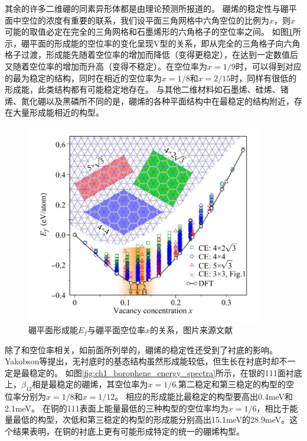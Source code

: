 其余的许多二维硼的同素异形体都是由理论预测所报道的\cite{liu2018intermixing, liu2013probing, penev2012polymorphism, zhang2017elasticity, zhao2016superconductivity, yang2008ab, zhang2016polyphony, tsafack2016thermomechanical, zhang2016substrate, ma2016graphene}。
硼烯的稳定性与硼平面中空位的浓度有重要的联系，我们设平面三角网格中六角空位的比例为$x$，则$x$可能的取值必定在完全的三角网格和石墨烯形的六角格子的空位率之间。
如图\ref{fig:ch1_formation_boronphenes}所示，硼平面的形成能的空位率的变化呈现V型的关系，即从完全的三角格子向六角格子过渡，形成能先随着空位率的增加而降低（变得更稳定），在达到一定数值后又随着空位率的增加而升高（变得不稳定）。在空位率为$x=1/9$时，可以得到对应的最为稳定的结构，同时在相近的空位率为$x=1/8$和$x=2/15$时，同样有很低的形成能，此类结构都有可能稳定地存在。
与其他二维材料如石墨烯、硅烯、锗烯、氮化硼以及黑磷所不同的是，硼烯的各种平面结构中在最稳定的结构附近，存在大量形成能相近的构型。

\begin{figure}
  \includegraphics[width=0.92\textwidth]{figs/ch1_formation_boronphenes.png}
  \centering
  \caption{硼平面形成能$E_f$与硼平面空位率$x$的关系，图片来源文献\cite{penev2012polymorphism}}
  \label{fig:ch1_formation_boronphenes}
\end{figure}

除了和空位率相关，如前面所列举的，硼烯的稳定性还受到了衬底的影响。
Yakobson等提出\cite{zhang2015two}，无衬底时的基态结构虽然形成能较低，但生长在衬底时却不一定是最稳定的。
如图\ref{fig:ch1_borophene_energy_spectra}所示，在银的111面衬底上，$\beta_{12}$相是最稳定的硼烯，其空位率为$x=1/6$.第二稳定和第三稳定的构型的空位率分别为$x=1/8$和$x=1/12$。
相应的形成能比最稳定的构型要高出0.4meV和2.1meV。
在铜的111表面上能量最低的三种构型的空位率均为$x=1/6$，相比于能量最低的构型，次低和第三稳定的构型的形成能分别高出15.1meV的28.9meV\cite{zhang2015two}。这个结果表明，在铜的衬底上更有可能形成特定的统一的硼烯构型。

